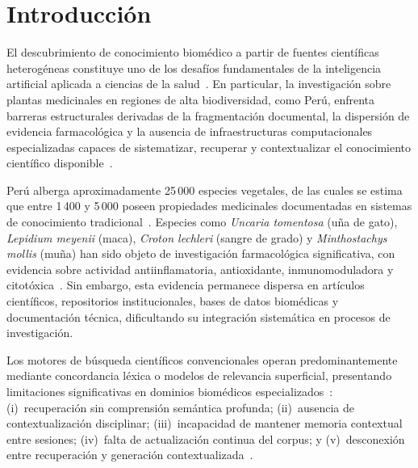 
\section{Introducción}
\label{sec:introduction}

El descubrimiento de conocimiento biomédico a partir de fuentes científicas heterogéneas constituye uno de los desafíos fundamentales de la inteligencia artificial aplicada a ciencias de la salud~\cite{lee2020biobert, gu2021domain}. En particular, la investigación sobre plantas medicinales en regiones de alta biodiversidad, como Perú, enfrenta barreras estructurales derivadas de la fragmentación documental, la dispersión de evidencia farmacológica y la ausencia de infraestructuras computacionales especializadas capaces de sistematizar, recuperar y contextualizar el conocimiento científico disponible~\cite{heinrich2020ethnopharmacology}.

Perú alberga aproximadamente 25\,000 especies vegetales, de las cuales se estima que entre 1\,400 y 5\,000 poseen propiedades medicinales documentadas en sistemas de conocimiento tradicional~\cite{bussmann2015toxicity}. Especies como \textit{Uncaria tomentosa} (uña de gato), \textit{Lepidium meyenii} (maca), \textit{Croton lechleri} (sangre de grado) y \textit{Minthostachys mollis} (muña) han sido objeto de investigación farmacológica significativa, con evidencia sobre actividad antiinflamatoria, antioxidante, inmunomoduladora y citotóxica~\cite{lock2016uncaria, gonzales2012ethnobiology}. Sin embargo, esta evidencia permanece dispersa en artículos científicos, repositorios institucionales, bases de datos biomédicas y documentación técnica, dificultando su integración sistemática en procesos de investigación.

Los motores de búsqueda científicos convencionales operan predominantemente mediante concordancia léxica o modelos de relevancia superficial, presentando limitaciones significativas en dominios biomédicos especializados~\cite{wang2018clinical}: (i)~recuperación sin comprensión semántica profunda; (ii)~ausencia de contextualización disciplinar; (iii)~incapacidad de mantener memoria contextual entre sesiones; (iv)~falta de actualización continua del corpus; y (v)~desconexión entre recuperación y generación contextualizada~\cite{karpukhin2020dense}.

